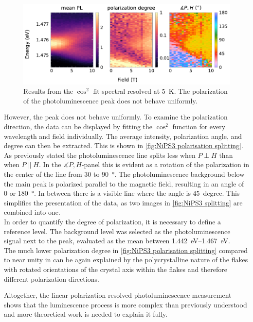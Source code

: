 \documentclass[
	twoside,
	parskip=half,
	a4paper,
]{scrbook}
\begin{document}
\begin{figure}
	\centering
	\includegraphics{../figures/2024-04-09 NiPS3 polarisation Splitting.pdf}
	\caption{Results from the $\cos^2$ fit spectral resolved at \SI{5}{K}. The polarization of the photoluminescence peak does not behave uniformly.}
	\label{fig:NiPS3 polarisation splitting}
\end{figure}
However, the peak does not behave uniformly.
To examine the polarization direction, the data can be displayed by fitting the $\cos^2$ function for every wavelength and field individually.
The average intensity, polarization angle, and degree can then be extracted.
This is shown in \autoref{fig:NiPS3 polarisation splitting}.\\
As previously stated the photoluminescence line splits less when $P\perp H$ than when $P\parallel H$.
In the $\measuredangle P, H$-panel this is evident as a rotation of the polarization in the center of the line from $30$ to \SI{90}{\degree}.
The photoluminescence background below the main peak is polarized parallel to the magnetic field, resulting in an angle of $0$ or \SI{180}{\degree}.
In between there is a visible line where the angle is \SI{45}{degree}.
This simplifies the presentation of the data, as two images in \autoref{fig:NiPS3 splitting} are combined into one.\\
In order to quantify the degree of polarization, it is necessary to define a reference level.
The background level was selected as the photoluminescence signal next to the peak, evaluated as the mean between \SIrange{1.442}{1.467}{eV}.\\
The much lower polarization degree in \autoref{fig:NiPS3 polarisation splitting} compared to near unity in \cite{NiPS3_anisotropic} can be again explained by the polycrystalline nature of the flakes with rotated orientations of the crystal axis within the flakes and therefore different polarization directions.

Altogether, the linear polarization-resolved photoluminescence measurement shows that the luminescence process is more complex than previously understood \cite{NiPS3_coherent,NiPS3_magnon_gap} and more theoretical work is needed to explain it fully.
\end{document}
